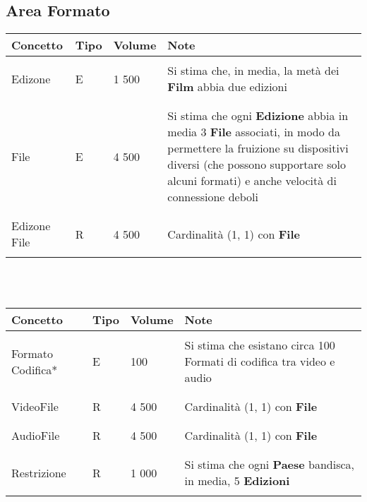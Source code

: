 \documentclass{article}
\begin{document}
\subsection{Area Formato}
\begin{tabular}{|C{2.3cm}|C{0.7cm}|C{1.7cm}|C{6.2cm}|}
\hline
    \textbf{Concetto} & \textbf{Tipo} & \textbf{Volume} & \textbf{Note} \\
\hline
\hline
& & & \\ 
    Edizone & E & 1 500 & Si stima che, in media, la metà dei \textbf{Film} abbia due edizioni \\
& & & \\
\hline
& & & \\    
    File & E & 4 500 & Si stima che ogni \textbf{Edizione} abbia in media 3 \textbf{File} associati, in modo da permettere la fruizione su dispositivi diversi (che possono supportare solo alcuni formati) e anche velocità di connessione deboli \\
& & & \\
\hline
& & & \\    
    Edizone File & R & 4 500 & Cardinalità (1, 1) con \textbf{File} \\
& & & \\
\hline
\end{tabular} \\ \\
\begin{tabular}{|C{2.3cm}|C{0.7cm}|C{1.7cm}|C{6.2cm}|}
\hline
    \textbf{Concetto} & \textbf{Tipo} & \textbf{Volume} & \textbf{Note} \\
\hline
\hline
& & & \\    
    Formato Codifica* & E & 100 & Si stima che esistano circa 100 Formati di codifica tra video e audio \\
& & & \\
\hline
& & & \\    
    VideoFile & R & 4 500 & Cardinalità (1, 1) con \textbf{File} \\
& & & \\
\hline
& & & \\    
    AudioFile & R & 4 500 & Cardinalità (1, 1) con \textbf{File} \\
& & & \\
\hline
& & & \\    
    Restrizione & R & 1 000 &  Si stima che ogni \textbf{Paese} bandisca, in media, 5 \textbf{Edizioni} \\
& & & \\ 
\hline
\end{tabular} \\
\end{document}

